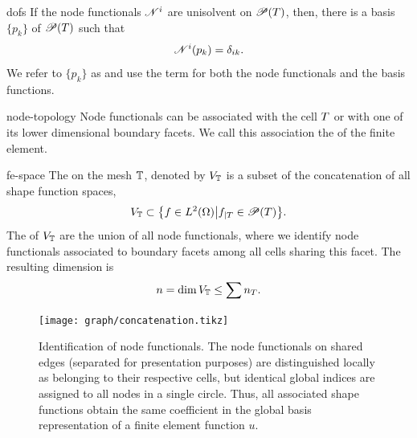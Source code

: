 \begin{Notation}{dofs}
  If the node functionals $\mathscr N^i$ are unisolvent on
  $\mathscr P(T)$, then, there is a basis $\{p_k\}$ of $\mathscr P(T)$
  such that
  \begin{gather}
    \mathscr N^i(p_k) = \delta_{ik}.
  \end{gather}
  We refer to $\{p_k\}$ as  and use the
  term  for both the node functionals and
  the basis functions.
\end{Notation}

\begin{Definition}{node-topology}
  Node functionals can be associated with the cell $T$ or with one
  of its lower dimensional boundary facets. We call this association
  the  of the finite element.
\end{Definition}

\begin{Definition}{fe-space}
  The  on the mesh $\mathbb T$, denoted by
  $V_\mathbb T$ is a subset of the concatenation of all shape function
  spaces,
  \begin{gather}
    V_\mathbb T \subset \bigl\{ f\in L^2(\Omega) \big|
    f_{|T} \in \mathscr P(T) \bigr\}.
  \end{gather}
  The  of $V_\mathbb T$ are the union of all
  node functionals, where we identify node functionals associated to
  boundary facets among all cells sharing this facet. The resulting
  dimension is
  \begin{gather}
    n = \dim V_\mathbb T \le \sum n_T.
  \end{gather}
\end{Definition}

\begin{figure}[tp]
  \begin{center}
    \texttt{[image: graph/concatenation.tikz]}
  \end{center}
  \caption{Identification of node functionals. The node functionals on
    shared edges (separated for presentation purposes) are
    distinguished locally as belonging to their respective cells, but
    identical global indices are assigned to all nodes in a single
    circle. Thus, all associated shape functions obtain the same
    coefficient in the global basis representation of a finite element
    function $u$.}
  \label{fig:nodes-identification}
\end{figure}

